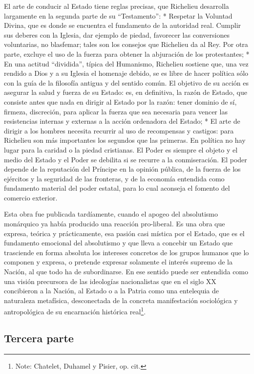 \documentclass[
]{book}
\begin{document}
El arte de conducir al Estado tiene reglas precisas, que Richelieu desarrolla largamente en la segunda parte de su ``Testamento'': * Respetar la Voluntad Divina, que es donde se encuentra el fundamento de la autoridad real. Cumplir sus deberes con la Iglesia, dar ejemplo de piedad, favorecer las conversiones voluntarias, no blasfemar; tales son los consejos que Richelieu da al Rey. Por otra parte, excluye el uso de la fuerza para obtener la abjuración de los protestantes; * En una actitud ``dividida'', típica del Humanismo, Richelieu sostiene que, una vez rendido a Dios y a su Iglesia el homenaje debido, se es libre de hacer política sólo con la guía de la filosofía antigua y del sentido común. El objetivo de su acción es asegurar la salud y fuerza de su Estado: es, en definitiva, la razón de Estado, que consiste antes que nada en dirigir al Estado por la razón: tener dominio de sí, firmeza, discreción, para aplicar la fuerza que sea necesaria para vencer las resistencias internas y externas a la acción ordenadora del Estado; * El arte de dirigir a los hombres necesita recurrir al uso de recompensas y castigos: para Richelieu son más importantes los segundos que las primeras. En política no hay lugar para la caridad o la piedad cristianas. El Poder es siempre el objeto y el medio del Estado y el Poder se debilita si se recurre a la conmiseración. El poder depende de la reputación del Príncipe en la opinión pública, de la fuerza de los ejércitos y la seguridad de las fronteras, y de la economía entendida como fundamento material del poder estatal, para lo cual aconseja el fomento del comercio exterior.

Esta obra fue publicada tardíamente, cuando el apogeo del absolutismo monárquico ya había producido una reacción pro-liberal. Es una obra que expresa, teórica y prácticamente, esa pasión casi mística por el Estado, que es el fundamento emocional del absolutismo y que lleva a concebir un Estado que trasciende en forma absoluta los intereses concretos de los grupos humanos que lo componen y expresa, o pretende expresar solamente el interés supremo de la Nación, al que todo ha de subordinarse. En ese sentido puede ser entendida como una visión precursora de las ideologías nacionalistas que en el siglo XX concibieron a la Nación, al Estado o a la Patria como una entelequia de naturaleza metafísica, desconectada de la concreta manifestación sociológica y antropológica de su encarnación histórica real\footnote{Note: Chatelet, Duhamel y Pisier, op. cit.}.

\hypertarget{tercera-parte-1}{%
\subsection*{Tercera parte}\label{tercera-parte-1}}
\end{document}

